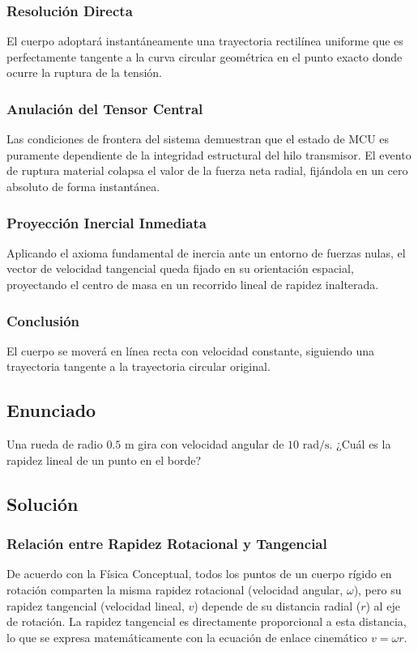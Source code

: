 \documentclass{article}
\begin{document}
\subsubsection*{Resolución Directa}
El cuerpo adoptará instantáneamente una trayectoria rectilínea uniforme que es perfectamente tangente a la curva circular geométrica en el punto exacto donde ocurre la ruptura de la tensión.

\subsubsection*{Anulación del Tensor Central}
Las condiciones de frontera del sistema demuestran que el estado de MCU es puramente dependiente de la integridad estructural del hilo transmisor. El evento de ruptura material colapsa el valor de la fuerza neta radial, fijándola en un cero absoluto de forma instantánea.

\subsubsection*{Proyección Inercial Inmediata}
Aplicando el axioma fundamental de inercia ante un entorno de fuerzas nulas, el vector de velocidad tangencial queda fijado en su orientación espacial, proyectando el centro de masa en un recorrido lineal de rapidez inalterada.

\subsubsection*{Conclusión}
El cuerpo se moverá en línea recta con velocidad constante, siguiendo una trayectoria tangente a la trayectoria circular original.

\newpage

\subsection*{Enunciado}
Una rueda de radio $0.5 \text{ m}$ gira con velocidad angular de $10 \text{ rad/s}$. ¿Cuál es la rapidez lineal de un punto en el borde?

\subsection*{Solución}

\subsubsection*{Relación entre Rapidez Rotacional y Tangencial}
De acuerdo con la Física Conceptual, todos los puntos de un cuerpo rígido en rotación comparten la misma rapidez rotacional (velocidad angular, $\omega$), pero su rapidez tangencial (velocidad lineal, $v$) depende de su distancia radial ($r$) al eje de rotación. La rapidez tangencial es directamente proporcional a esta distancia, lo que se expresa matemáticamente con la ecuación de enlace cinemático $v = \omega r$.
\end{document}
